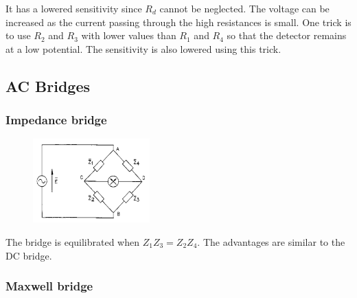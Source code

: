 It has a lowered sensitivity since $R_d$
cannot be neglected.
The voltage can be increased as the current passing through the high resistances is small.
One trick is to use $R_2$ and $R_3$
with lower values than $R_1$ and
$R_4$ so that the detector remains
at a low potential.
The sensitivity is also lowered
using this trick.

\subsection{AC Bridges}

\subsubsection{Impedance bridge}

\begin{figure}[H]
    \centering
    \includegraphics[width = 0.4\textwidth]{L4/img/impedance-bridge.PNG}
\end{figure}

The bridge is equilibrated when $Z_1 Z_3 = Z_2 Z_4$. The advantages are similar to the DC bridge. 

\subsubsection{Maxwell bridge}

